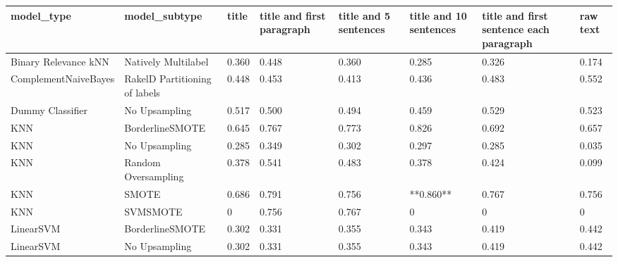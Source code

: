 \begin{tabular}{llllllll}
\toprule
                     model\_type &                 model\_subtype & title & title and first paragraph & title and 5 sentences & title and 10 sentences & title and first sentence each paragraph & raw text \\
\midrule
           Binary Relevance kNN &           Natively Multilabel & 0.360 &                     0.448 &                 0.360 &                  0.285 &                                   0.326 &    0.174 \\
           ComplementNaiveBayes & RakelD Partitioning of labels & 0.448 &                     0.453 &                 0.413 &                  0.436 &                                   0.483 &    0.552 \\
               Dummy Classifier &                 No Upsampling & 0.517 &                     0.500 &                 0.494 &                  0.459 &                                   0.529 &    0.523 \\
                            KNN &               BorderlineSMOTE & 0.645 &                     0.767 &                 0.773 &                  0.826 &                                   0.692 &    0.657 \\
                            KNN &                 No Upsampling & 0.285 &                     0.349 &                 0.302 &                  0.297 &                                   0.285 &    0.035 \\
                            KNN &           Random Oversampling & 0.378 &                     0.541 &                 0.483 &                  0.378 &                                   0.424 &    0.099 \\
                            KNN &                         SMOTE & 0.686 &                     0.791 &                 0.756 &              **0.860** &                                   0.767 &    0.756 \\
                            KNN &                      SVMSMOTE &     0 &                     0.756 &                 0.767 &                      0 &                                       0 &        0 \\
                      LinearSVM &               BorderlineSMOTE & 0.302 &                     0.331 &                 0.355 &                  0.343 &                                   0.419 &    0.442 \\
                      LinearSVM &                 No Upsampling & 0.302 &                     0.331 &                 0.355 &                  0.343 &                                   0.419 &    0.442 \\

\end{tabular}
